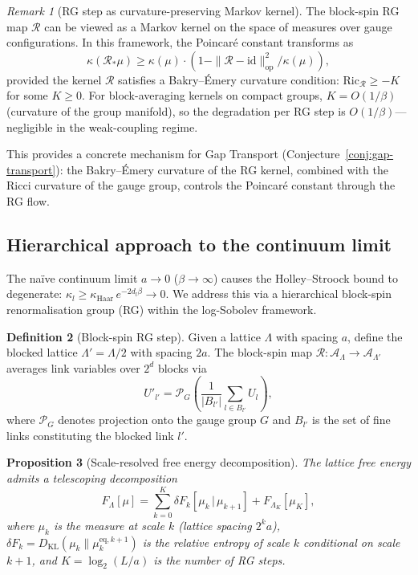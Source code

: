 \documentclass[12pt,a4paper]{article}
\theoremstyle{definition}
\newtheorem{definition}{Definition}[section]
\theoremstyle{plain}
\newtheorem{proposition}[definition]{Proposition}
\theoremstyle{remark}
\newtheorem{remark}[definition]{Remark}
\begin{document}
\begin{remark}[RG step as curvature-preserving Markov kernel]
\label{rem:rg-markov-kernel}
The block-spin RG map $\mathcal{R}$ can be viewed as a Markov kernel on the space of measures over gauge configurations. In this framework, the Poincar\'e constant transforms as
\[
\kappa(\mathcal{R}_* \mu) \geq \kappa(\mu) \cdot \left(1 - \|\mathcal{R} - \mathrm{id}\|_{\mathrm{op}}^2 / \kappa(\mu) \right),
\]
provided the kernel $\mathcal{R}$ satisfies a Bakry--\'Emery curvature condition: $\mathrm{Ric}_{\mathcal{R}} \geq -K$ for some $K \geq 0$. For block-averaging kernels on compact groups, $K = O(1/\beta)$ (curvature of the group manifold), so the degradation per RG step is $O(1/\beta)$---negligible in the weak-coupling regime.

This provides a concrete mechanism for Gap Transport (Conjecture~\ref{conj:gap-transport}): the Bakry--\'Emery curvature of the RG kernel, combined with the Ricci curvature of the gauge group, controls the Poincar\'e constant through the RG flow.
\end{remark}

\subsection{Hierarchical approach to the continuum limit}
\label{sec:hierarchical-continuum}

The na\"ive continuum limit $a \to 0$ ($\beta \to \infty$) causes the Holley--Stroock bound to degenerate: $\kappa_l \geq \kappa_{\mathrm{Haar}}\, e^{-2d_l\beta} \to 0$. We address this via a hierarchical block-spin renormalisation group (RG) within the log-Sobolev framework.

\begin{definition}[Block-spin RG step]
\label{def:block-rg}
Given a lattice $\Lambda$ with spacing $a$, define the blocked lattice $\Lambda' = \Lambda / 2$ with spacing $2a$. The block-spin map $\mathcal{R}: \mathcal{A}_\Lambda \to \mathcal{A}_{\Lambda'}$ averages link variables over $2^d$ blocks via
\[
U'_{l'} = \mathcal{P}_G\!\left( \frac{1}{|B_{l'}|} \sum_{l \in B_{l'}} U_l \right),
\]
where $\mathcal{P}_G$ denotes projection onto the gauge group $G$ and $B_{l'}$ is the set of fine links constituting the blocked link $l'$.
\end{definition}

\begin{proposition}[Scale-resolved free energy decomposition]
\label{prop:scale-resolved}
The lattice free energy admits a telescoping decomposition
\[
F_\Lambda[\mu] = \sum_{k=0}^{K} \delta F_k[\mu_k \,|\, \mu_{k+1}] + F_{\Lambda_K}[\mu_K],
\]
where $\mu_k$ is the measure at scale $k$ (lattice spacing $2^k a$), $\delta F_k = D_{\mathrm{KL}}(\mu_k \| \mu_k^{\mathrm{eq},k+1})$ is the relative entropy of scale $k$ conditional on scale $k+1$, and $K = \log_2(L/a)$ is the number of RG steps.
\end{proposition}
\end{document}

